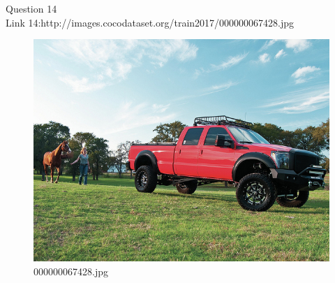 Question 14\\
Link 14:http://images.cocodataset.org/train2017/000000067428.jpg
    \begin{figure}[h]
        \centering
        \includegraphics[width=0.8\linewidth]{../image set/easy/000000067428.jpg}
        \caption{000000067428.jpg}
    \end{figure}
